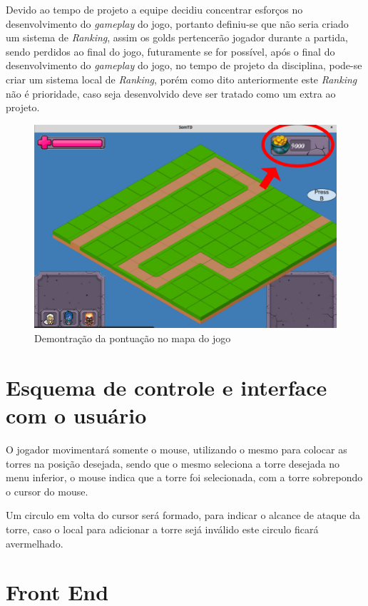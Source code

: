 \documentclass[11pt]{article} %
\begin{document}
Devido ao tempo de projeto a equipe decidiu concentrar esforços no desenvolvimento do \textit{gameplay} do jogo, portanto definiu-se que não seria criado um sistema de \textit{Ranking}, assim os golds pertencerão jogador durante a partida, sendo perdidos ao final do jogo, futuramente se for possível, após o final do desenvolvimento do \textit{gameplay} do jogo, no tempo de projeto da disciplina, pode-se criar um sistema local de \textit{Ranking}, porém como dito anteriormente este \textit{Ranking} não é prioridade, caso seja desenvolvido deve ser tratado como um extra ao projeto.  

\begin{figure}[!htp]
\centering
\includegraphics[scale=0.3]{res/pontuacao.png}
\caption{Demontração da pontuação no mapa do jogo}
\label{pontuacao}
\end{figure}
 

\section{Esquema de controle e interface com o usuário}

O jogador movimentará somente o mouse, utilizando o mesmo para colocar as torres na posição desejada, sendo que o mesmo seleciona a torre desejada no menu inferior, o mouse indica que a torre foi selecionada, com a torre sobrepondo o cursor do mouse.

Um circulo em volta do cursor será formado, para indicar o alcance de ataque da torre, caso o local para adicionar a torre sejá inválido este circulo ficará avermelhado.  

\newpage

\section{Front End}
\end{document}
